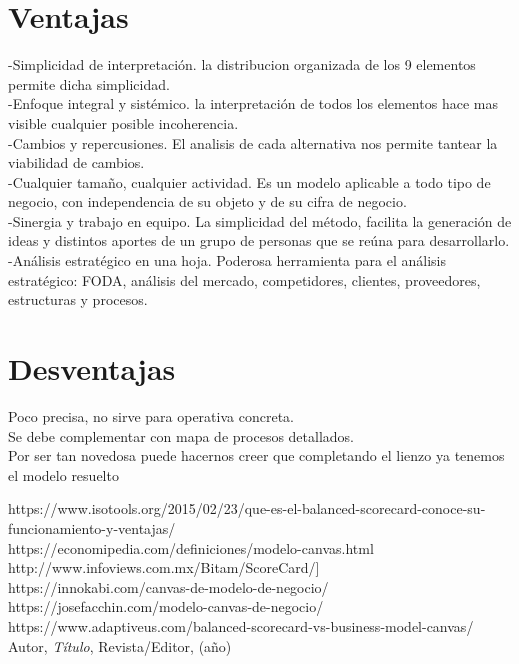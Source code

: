 \section{Ventajas}
\item{-Simplicidad de interpretación. la distribucion organizada de los  9 elementos permite dicha simplicidad.\\
-Enfoque integral y sistémico. la interpretación de todos los elementos hace mas visible cualquier posible incoherencia.\\
-Cambios y repercusiones. El analisis de cada alternativa nos permite tantear la viabilidad de cambios.\\
-Cualquier tamaño, cualquier actividad. Es un modelo aplicable a todo tipo de negocio, con independencia de su objeto y de su cifra de negocio.\\
-Sinergia y trabajo en equipo. La simplicidad del método, facilita la generación de ideas y distintos aportes de un grupo de personas que se reúna para desarrollarlo. \\
-Análisis estratégico en una hoja. Poderosa herramienta para el análisis estratégico: FODA, análisis del mercado, competidores, clientes, proveedores, estructuras y procesos.
}

\section{Desventajas}
\item{
Poco precisa, no sirve para operativa concreta.\\
Se debe complementar con mapa de procesos detallados.\\
Por ser tan novedosa puede hacernos creer que completando el lienzo ya tenemos el modelo resuelto}

\begin{thebibliography}{99}
https://www.isotools.org/2015/02/23/que-es-el-balanced-scorecard-conoce-su-funcionamiento-y-ventajas/\\
https://economipedia.com/definiciones/modelo-canvas.html\\
http://www.infoviews.com.mx/Bitam/ScoreCard/]\\
https://innokabi.com/canvas-de-modelo-de-negocio/\\
https://josefacchin.com/modelo-canvas-de-negocio/\\
https://www.adaptiveus.com/balanced-scorecard-vs-business-model-canvas/\\

 Autor, \emph{Título}, Revista/Editor, (año)

\end{thebibliography}


